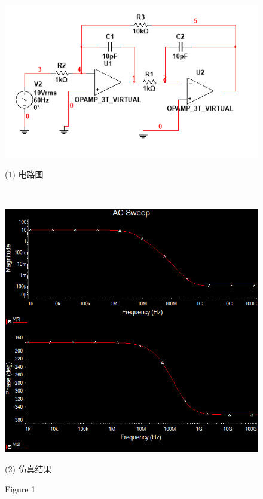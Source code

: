 \documentclass[hyperref, UTF8]{ctexart}
\begin{document}
\begin{figure}[!htb]
    \centering
    \begin{minipage}[t]{0.346\textwidth}
    \centering
    \includegraphics[width=1\textwidth]{cir.png}
    \caption*{(1) 电路图}
    \end{minipage}
    \\
    \begin{minipage}[t]{0.453\textwidth}
    \centering
    \includegraphics[width=1\textwidth]{res.png}
    \caption*{(2) 仿真结果}
    \end{minipage}
    \caption*{Figure 1}
\end{figure}    
\end{document}
